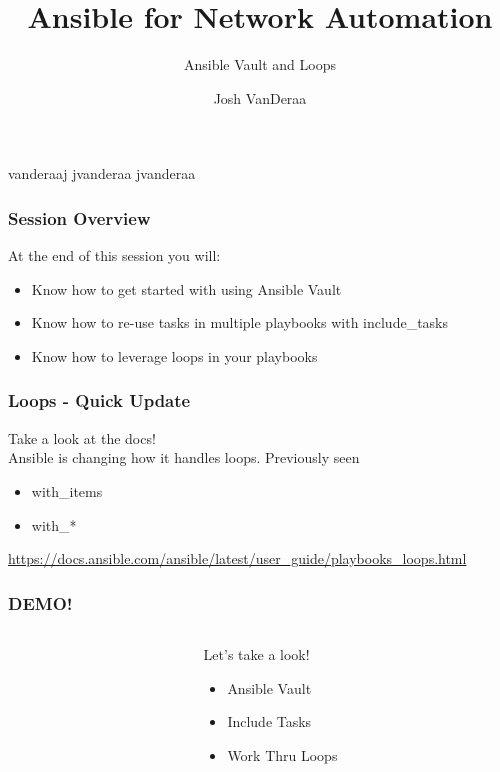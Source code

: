 \documentclass[aspectratio=169]{beamer}
\title{Ansible for Network Automation}
\subtitle{Ansible Vault and Loops}
\date{}
\author{Josh VanDeraa}
\begin{document}
\begin{frame}
  \maketitle
  \footnotesize
  \faTwitter vanderaaj \hfill \faGithub jvanderaa \hfill \faSlack jvanderaa
\end{frame}

\begin{frame}
  \frametitle{Session Overview}
  At the end of this session you will:
  \begin{itemize}
    \item <2-> Know how to get started with using Ansible Vault
    \item <3-> Know how to re-use tasks in multiple playbooks with include\_tasks
    \item <3-> Know how to leverage loops in your playbooks
  \end{itemize}
\end{frame}

\begin{frame}
  \frametitle{Loops - Quick Update}
  \begin{center}
    \Huge Take a look at the docs!\\
    \normalsize
    Ansible is changing how it handles loops. Previously seen\\
    \begin{itemize}
      \item with\_items
      \item with\_*
    \end{itemize}
    \url{https://docs.ansible.com/ansible/latest/user_guide/playbooks_loops.html}
  \end{center}
\end{frame}
  
\begin{frame}
  \frametitle{DEMO!}
  \begin{columns}
  \begin{column}{0.3\textwidth}
    \Huge
    \begin{center}
      \faDesktop 
      \hspace{.5cm}
      \faRocket     
    \end{center}
  \end{column}
  \begin{column}{0.7\textwidth}
    \huge 
      Let's take a look!
      \begin{itemize}
        \item Ansible Vault
        \item Include Tasks
        \item Work Thru Loops
      \end{itemize}
  \end{column}
  \end{columns}
\end{frame}
\end{document}
